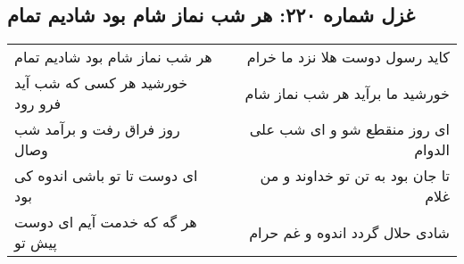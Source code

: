 \begin{center}
\section*{غزل شماره ۲۲۰: هر شب نماز شام بود شادیم تمام}
\label{sec:220}
\begin{longtable}{l p{0.5cm} r}
هر شب نماز شام بود شادیم تمام
&&
کاید رسول دوست هلا نزد ما خرام
\\
خورشید هر کسی که شب آید فرو رود
&&
خورشید ما برآید هر شب نماز شام
\\
روز فراق رفت و برآمد شب وصال
&&
ای روز منقطع شو و ای شب علی الدوام
\\
ای دوست تا تو باشی اندوه کی بود
&&
تا جان بود به تن تو خداوند و من غلام
\\
هر گه که خدمت آیم ای دوست پیش تو
&&
شادی حلال گردد اندوه و غم حرام
\\
\end{longtable}
\end{center}
